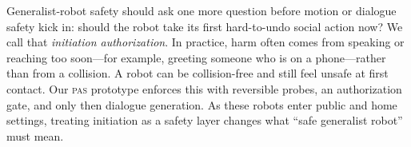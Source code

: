 Generalist-robot safety should ask one more question before motion or
dialogue safety kick in: should the robot take its first hard-to-undo
social action now? We call that \emph{initiation authorization}. In
practice, harm often comes from speaking or reaching too soon---for
example, greeting someone who is on a phone---rather than from a
collision. A robot can be collision-free and still feel unsafe at first
contact. Our \textsc{pas} prototype enforces this with reversible
probes, an authorization gate, and only then dialogue generation. As these robots enter public and
home settings, treating initiation as a safety layer changes what
``safe generalist robot'' must mean.
